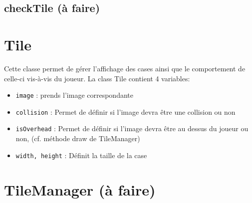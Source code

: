 \documentclass[11pt,a4paper,french]{article}
\begin{document}
\subsection{checkTile (à faire)}

\section{Tile}
Cette classe permet de gérer l'affichage des cases ainsi que le comportement de celle-ci vis-à-vis du joueur. 
La class Tile contient 4 variables:
\begin{itemize}
    \item \verb|image| : prends l'image correspondante
    \item \verb|collision| : Permet de définir si l'image devra être une collision ou non
    \item \verb|isOverhead| : Permet de définir si l'image devra être au dessus du joueur ou non, (cf. méthode draw de TileManager)
    \item \verb|width, height| : Définit la taille de la case
\end{itemize}

\section{TileManager (à faire)}
\end{document}
